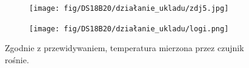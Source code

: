 \documentclass[11pt, a4paper]{article}
\begin{document}
\begin{figure}[h]
\begin{subfigure}{.5\textwidth}
\centering
\texttt{[image: fig/DS18B20/działanie\_ukladu/zdj5.jpg]}
\label{fig:_zdjecie_elementu}
\end{subfigure}%
\begin{subfigure}{.5\textwidth}
\centering
\texttt{[image: fig/DS18B20/działanie\_ukladu/logi.png]}
\label{fig:_zasada_dzialania_elementu}
\end{subfigure}
\caption{Zgodnie z przewidywaniem, temperatura mierzona przez czujnik rośnie. }
\end{figure}


\newpage
\printbibliography[heading=bibintoc]
\end{document}
